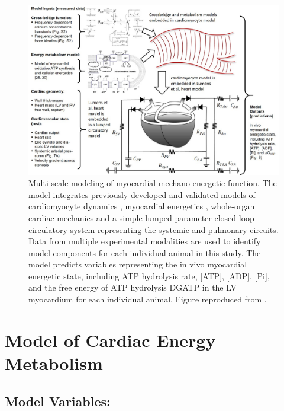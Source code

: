 \documentclass[fleqn,10pt]{physiome}
\begin{document}
\begin{figure}[ht]\centering
\includegraphics[width=1.0\linewidth]{Figure1}
\caption{Multi-scale modeling of myocardial mechano-energetic function. The model integrates previously developed and validated models of cardiomyocyte dynamics \cite{Tewari2016a,Tewari2016b}, myocardial energetics \cite{Bazil2016, Gao2019}, whole-organ cardiac mechanics \cite{Lumens2009} and a simple lumped parameter closed-loop circulatory system representing the systemic and pulmonary circuits. Data from multiple experimental modalities are used to identify model components for each individual animal in this study. The model predicts variables representing the in vivo myocardial energetic state, including ATP hydrolysis rate, [ATP], [ADP], [Pi], and the free energy of ATP hydrolysis DGATP in the LV myocardium for each individual animal. Figure reproduced from \cite{Lopez2020}.}
\label{fig:overview}
\end{figure}

\section{Model of Cardiac Energy Metabolism}

\subsection{Model Variables:}
\end{document}
